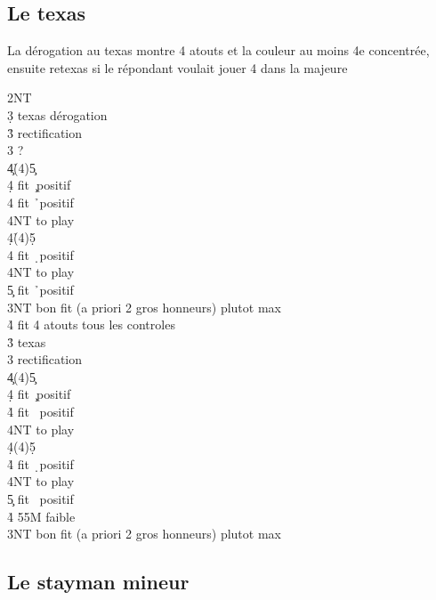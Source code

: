 \documentclass[a4paper]{article}
\begin{document}
\subsection{Le texas}

La dérogation au texas montre 4 atouts et la couleur au moins 4e concentrée, ensuite retexas si le répondant voulait jouer 4 dans la majeure

\begin{bidtable}
2NT\+\\
3\d \> texas dérogation\+\\
3\h \> rectification\+\\
3\s \> ?\\
4\c {}\h (4)5\c \+\\
4\d \> fit \c\ positif\\
4\s \> fit \h\ positif\\
4NT \> to play\-\\
4\d {}\h (4)5\d \+\\
4\s \> fit \d\ positif\\
4NT \> to play\\
5\c \> fit \h\ positif\-\-\\
3NT \> bon fit (a priori 2 gros honneurs) plutot max\\
4\h \> fit 4 atouts tous les controles\-\\
3\h \> texas\+\\
3\s \> rectification\+\\
4\c {}\s (4)5\c \+\\
4\d \> fit \c\ positif\\
4\h \> fit \s\ positif\\
4NT \> to play\-\\
4\d {}\s (4)5\d \+\\
4\h \> fit \d\ positif\\
4NT \> to play\\
5\c \> fit \s\ positif\-\\
4\h \> 55M faible\-\\
3NT \> bon fit (a priori 2 gros honneurs) plutot max\-\-
\end{bidtable}

\subsection{Le stayman mineur}
\end{document}
